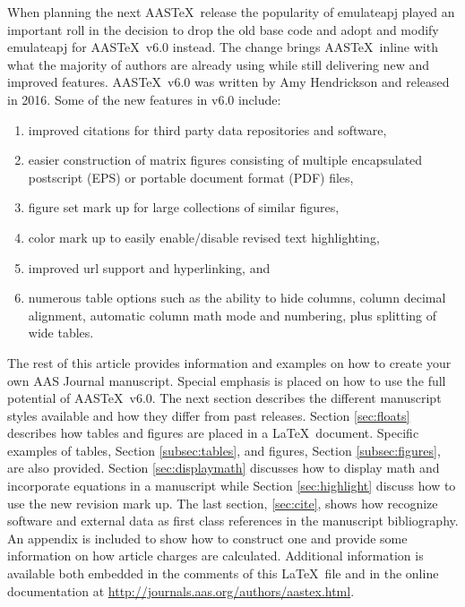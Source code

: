 \documentclass{aastex6}
\newcommand\aastex{AAS\TeX}
\newcommand\latex{La\TeX}
\begin{document}
When planning the next \aastex\ release the popularity of emulateapj played
an important roll in the decision to drop the old base code and adopt and
modify emulateapj for \aastex\ v6.0 instead.  The change brings \aastex\
inline with what the majority of authors are already using while still
delivering new and improved features.  \aastex\ v6.0 was written by Amy
Hendrickson and released in 2016.  Some of the new features in v6.0
include:

\begin{enumerate}
\item improved citations for third party data repositories and software,
\item easier construction of matrix figures consisting of multiple
encapsulated postscript (EPS) or portable document format (PDF) files,
\item figure set mark up for large collections of similar figures,
\item color mark up to easily enable/disable revised text highlighting,
\item improved url support and hyperlinking, and
\item numerous table options such as the ability to hide columns, column
decimal alignment, automatic column math mode and numbering, plus splitting of
wide tables.
\end{enumerate}

The rest of this article provides information and examples on how to create
your own AAS Journal manuscript.  Special emphasis is placed on how to use
the full potential of \aastex\ v6.0.  The next section describes the
different manuscript styles available and how they differ from past
releases.  Section \ref{sec:floats} describes how tables and figures are
placed in a \latex\ document. Specific examples of tables, Section
\ref{subsec:tables}, and figures, Section \ref{subsec:figures}, are also
provided.  Section \ref{sec:displaymath} discusses how to display math and
incorporate equations in a manuscript while Section \ref{sec:highlight}
discuss how to use the new revision mark up.  The last section,
\ref{sec:cite}, shows how recognize software and external data as first
class references in the manuscript bibliography.  An appendix is included
to show how to construct one and provide some information on how article
charges are calculated.  Additional information is available both embedded
in the comments of this \latex\ file and in the online documentation at
\url{http://journals.aas.org/authors/aastex.html}.
\end{document}
